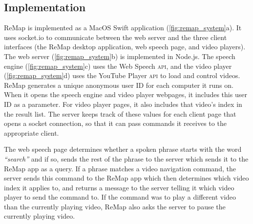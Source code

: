 \subsection{Implementation}
ReMap is implemented as a MacOS Swift application (\autoref{fig:remap_system}a). It uses socket.io to communicate between the web server and the three client interfaces (the ReMap desktop application, web speech page, and video players). The web server (\autoref{fig:remap_system}b) is implemented in Node.js. The speech engine (\autoref{fig:remap_system}c) uses the Web Speech \textsc{api}, and the video player (\autoref{fig:remap_system}d) uses the YouTube Player \textsc{api} to load and control videos. ReMap generates a unique anonymous user ID for each computer it runs on. When it opens the speech engine and video player webpages, it includes this user ID as a parameter. For video player pages, it also includes that video's index in the result list. The server keeps track of these values for each client page that opens a socket connection, so that it can pass commands it receives to the appropriate client.

The web speech page determines whether a spoken phrase starts with the word \textit{``search''} and if so, sends the rest of the phrase to the server which sends it to the ReMap app as a query. If a phrase matches a video navigation command, the server sends this command to the ReMap app which then determines which video index it applies to, and returns a message to the server telling it which video player to send the command to. If the command was to play a different video than the currently playing video, ReMap also asks the server to pause the currently playing video.
